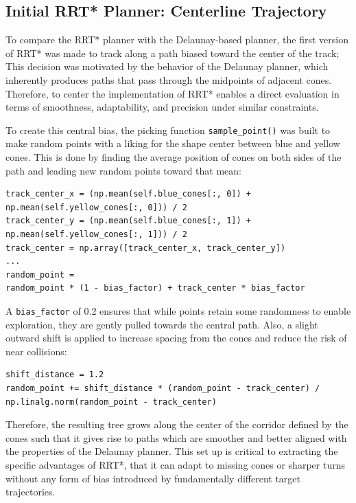 \documentclass[a4paper,11pt]{report}
\begin{document}
\subsection{Initial RRT* Planner: Centerline Trajectory}

To compare the RRT* planner with the Delaunay-based planner,
the first version of RRT* was made to track along a path biased toward the center of the track;
This decision was motivated by the behavior of the Delaunay planner, which inherently produces paths 
that pass through the midpoints of adjacent cones. Therefore, to center the implementation of RRT* 
enables a direct evaluation in terms of smoothness, adaptability, and precision under similar constraints.

To create this central bias, the picking function \texttt{sample\_point()} was built to make
random points with a liking for the shape center between blue and yellow cones.
This is done by finding the average position of cones on both sides of the
path and leading new random points toward that mean:

\begin{verbatim}
track_center_x = (np.mean(self.blue_cones[:, 0]) + 
np.mean(self.yellow_cones[:, 0])) / 2
track_center_y = (np.mean(self.blue_cones[:, 1]) + 
np.mean(self.yellow_cones[:, 1])) / 2
track_center = np.array([track_center_x, track_center_y])
...
random_point = 
random_point * (1 - bias_factor) + track_center * bias_factor

\end{verbatim}

A \texttt{bias\_factor} of 0.2  ensures that while points retain some randomness to enable
exploration, they are gently pulled towards the central path. Also, a slight outward
shift is applied to increase spacing from the cones and reduce the risk of near collisions:

\begin{verbatim}
shift_distance = 1.2
random_point += shift_distance * (random_point - track_center) / 
np.linalg.norm(random_point - track_center)
\end{verbatim}

Therefore, the resulting tree grows along the center of the corridor defined by the cones
such that it gives rise to paths which are smoother and better aligned with the properties of the Delaunay planner.
This set up is critical to extracting the specific advantages of RRT*, that it
can adapt to missing cones or sharper turns without any form of bias introduced by fundamentally different target trajectories.
\end{document}
